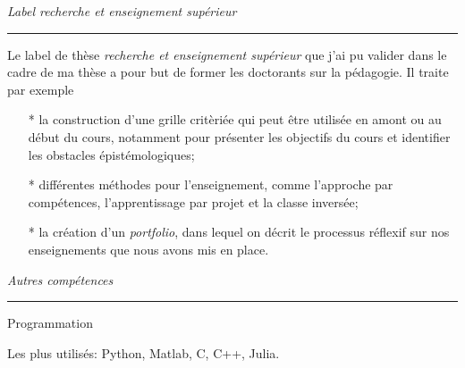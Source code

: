 {	%
	\noindent
	\textit{\Large \color{MyGray} \hspace{5mm} Label recherche et enseignement supérieur}
	\vspace{2mm}
	{\color{DefaultGray}\hrule height .1pt}
	\vspace{5mm}
	Le label de thèse \emph{recherche et enseignement supérieur} que j'ai pu valider dans le cadre de ma thèse a pour but de former les doctorants sur la pédagogie. Il traite par exemple
	\begin{itemize}
		\item[*] la construction d'une grille critèriée qui peut être utilisée en amont ou au début du cours, notamment pour présenter les objectifs du cours et identifier les obstacles épistémologiques;
		\item[*] différentes méthodes pour l'enseignement, comme l'approche par compétences, l'apprentissage par projet et la classe inversée;
		\item[*] la création d'un \emph{portfolio}, dans lequel on décrit le processus réflexif sur nos enseignements que nous avons mis en place.
	\end{itemize}
	
	\vspace{5mm}
	
	\noindent
	\textit{\Large \color{MyGray} \hspace{5mm} Autres compétences}
	\vspace{2mm}
	{\color{DefaultGray}\hrule height .1pt}
	\vspace{5mm}
	
	\noindent
	\begin{minipage}{0.20\textwidth}
		\color{MyGray} Programmation
	\end{minipage}
	\hfill
	\begin{minipage}{0.70\textwidth}
		Les plus utilisés: Python, Matlab, C, C++, Julia.\\
	\end{minipage}\\
	\vspace{2mm}
	
}
